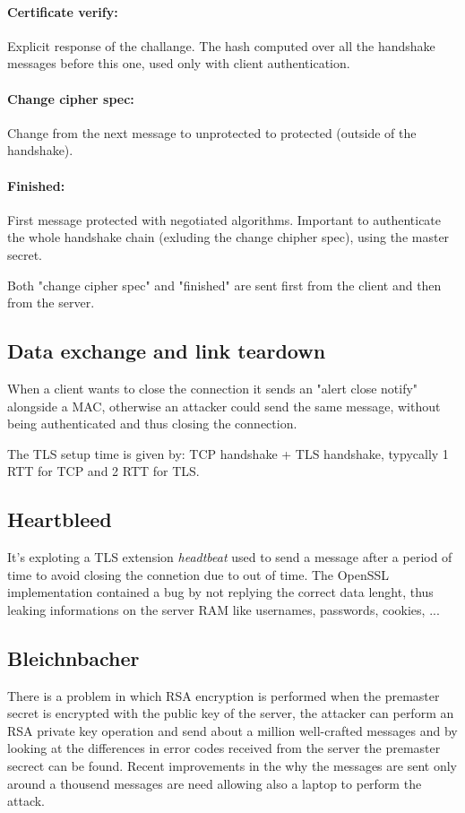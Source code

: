 \documentclass[12pt]{article}
\begin{document}
\paragraph{Certificate verify:}
Explicit response of the challange. The hash computed over all the handshake messages before this one, used only with client authentication.

\paragraph{Change cipher spec:}
Change from the next message to unprotected to protected (outside of the handshake).

\paragraph{Finished:}
First message protected with negotiated algorithms. Important to authenticate the whole handshake chain (exluding the change chipher spec), using the master secret.

Both "change cipher spec" and "finished" are sent first from the client and then from the server.


\subsection{Data exchange and link teardown}
When a client wants to close the connection it sends an "alert close notify" alongside a MAC, otherwise an attacker could send the same message, without being authenticated and thus closing the connection.

The TLS setup time is given by: TCP handshake + TLS handshake, typycally 1 RTT for TCP and 2 RTT for TLS.


\subsection{Heartbleed}
It's exploting a TLS extension \textit{headtbeat} used to send a message after a period of time to avoid closing the connetion due to out of time. The OpenSSL implementation contained a bug by not replying the correct data lenght, thus leaking informations on the server RAM like usernames, passwords, cookies, ...

\subsection{Bleichnbacher}
There is a problem in which RSA encryption is performed when the premaster secret is encrypted with the public key of the server, the attacker can perform an RSA private key operation and send about a million well-crafted messages and by looking at the differences in error codes received from the server the premaster secrect can be found. Recent improvements in the why the messages are sent only around a thousend messages are need allowing also a laptop to perform the attack.
\end{document}
